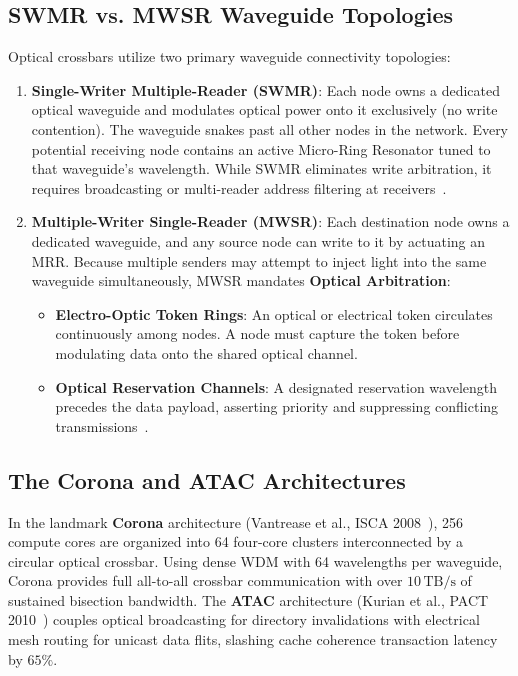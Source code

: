 \subsection{SWMR vs. MWSR Waveguide Topologies}
Optical crossbars utilize two primary waveguide connectivity topologies:
\begin{enumerate}
    \item \textbf{Single-Writer Multiple-Reader (SWMR)}:
    Each node owns a dedicated optical waveguide and modulates optical power onto it exclusively (no write contention). The waveguide snakes past all other nodes in the network. Every potential receiving node contains an active Micro-Ring Resonator tuned to that waveguide's wavelength. While SWMR eliminates write arbitration, it requires broadcasting or multi-reader address filtering at receivers~\cite{Vantrease2008}.
    \item \textbf{Multiple-Writer Single-Reader (MWSR)}:
    Each destination node owns a dedicated waveguide, and any source node can write to it by actuating an MRR. Because multiple senders may attempt to inject light into the same waveguide simultaneously, MWSR mandates \textbf{Optical Arbitration}:
    \begin{itemize}
        \item \textbf{Electro-Optic Token Rings}: An optical or electrical token circulates continuously among nodes. A node must capture the token before modulating data onto the shared optical channel.
        \item \textbf{Optical Reservation Channels}: A designated reservation wavelength precedes the data payload, asserting priority and suppressing conflicting transmissions~\cite{Kurian2010,Vantrease2008}.
    \end{itemize}
\end{enumerate}

\subsection{The Corona and ATAC Architectures}
In the landmark \textbf{Corona} architecture (Vantrease et al., ISCA 2008~\cite{Vantrease2008}), 256 compute cores are organized into 64 four-core clusters interconnected by a circular optical crossbar. Using dense WDM with 64 wavelengths per waveguide, Corona provides full all-to-all crossbar communication with over $10\,\mathrm{TB/s}$ of sustained bisection bandwidth. The \textbf{ATAC} architecture (Kurian et al., PACT 2010~\cite{Kurian2010}) couples optical broadcasting for directory invalidations with electrical mesh routing for unicast data flits, slashing cache coherence transaction latency by $65\%$.

